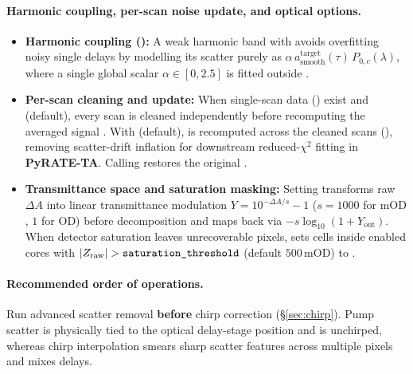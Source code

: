 \paragraph{Harmonic coupling, per-scan noise update, and optical options.}
\begin{itemize}
  \item \textbf{Harmonic coupling ():} A weak harmonic band
        with  avoids overfitting noisy single
        delays by modelling its scatter purely as $\alpha\,a_{\mathrm{smooth}}^{\mathrm{target}}(\tau)\,P_{0,c}(\lambda)$,
        where a single global scalar $\alpha \in [0, 2.5]$ is fitted outside
        .
  \item \textbf{Per-scan cleaning and  update:} When single-scan
        data () exist and  (default), every
        scan is cleaned independently before recomputing the averaged signal
        . With  (default), 
        is recomputed across the cleaned scans (), removing
        scatter-drift inflation for downstream reduced-$\chi^2$ fitting in
        \textbf{PyRATE-TA}. Calling  restores
        the original .
  \item \textbf{Transmittance space and saturation masking:} Setting
         transforms raw $\Delta A$ into linear
        transmittance modulation $Y = 10^{-\Delta A/s} - 1$ ($s = 1000$ for
        $\mathrm{mOD}$, $1$ for $\mathrm{OD}$) before decomposition and maps
        back via $-s\log_{10}(1 + Y_{\mathrm{out}})$. When detector saturation
        leaves unrecoverable pixels,  sets cells
        inside enabled cores with $|Z_{\mathrm{raw}}| > \texttt{saturation\_threshold}$
        (default $500\,\mathrm{mOD}$) to .
\end{itemize}

\paragraph{Recommended order of operations.}
Run advanced scatter removal \textbf{before} chirp correction
(\S\ref{sec:chirp}). Pump scatter is physically tied to the optical delay-stage
position and is unchirped, whereas chirp interpolation smears sharp scatter
features across multiple pixels and mixes delays.

